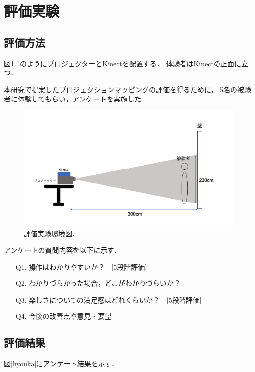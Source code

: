 \chapter{評価実験}
\thispagestyle{fancy}


\section{評価方法}
図\ref{kankyou}のようにプロジェクターとKinectを配置する．
体験者はKinectの正面に立つ．

本研究で提案したプロジェクションマッピングの評価を得るために，
5名の被験者に体験してもらい，アンケートを実施した．

\vspace{1cm}
\begin{figure}[h]
  \centering
  \includegraphics[width=14cm]{image/jikkenkankyou.png}
  \caption[評価実験環境図]{評価実験環境図．}
\label{kankyou}
\end{figure}


\clearpage

アンケートの質問内容を以下に示す．
\begin{itemize}
  \item[Q1.] 操作はわかりやすいか？　[5段階評価]
  \item[Q2.] わかりづらかった場合，どこがわかりづらいか？ 
  \item[Q3.] 楽しさについての満足感はどれくらいか？　[5段階評価]
  \item[Q4.] 今後の改善点や意見・要望
\end{itemize}



\section{評価結果}
図\ref{hyouka}にアンケート結果を示す．

